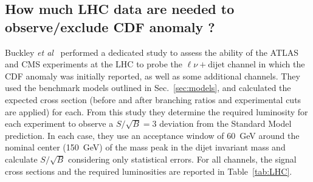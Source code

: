 \subsection{How much LHC data are needed to observe/exclude CDF anomaly ?}
\label{sec:dataneeded}
Buckley \textit{et al}~\cite{BuckleyHooperMartin} 
performed a dedicated study to assess the 
ability of the ATLAS and CMS experiments at the LHC to 
probe the $\ell\nu+\text{dijet}$ channel in which the CDF 
anomaly was initially reported, as well as some additional channels.
They used the benchmark models outlined in Sec.~\ref{sec:models}, 
and calculated the expected cross section (before and after 
branching ratios and experimental cuts are applied) for each.
From this study they 
determine the required luminosity for each experiment to 
observe a $S/\sqrt{B} = 3$ deviation from the Standard Model prediction. 
In each case, they use an acceptance window of 60~GeV around 
the nominal center (150~GeV) of the mass peak in the dijet 
invariant mass and calculate $S/\sqrt{B}$ considering only 
statistical errors.
For all channels, the signal cross sections and the required luminosities 
are reported in Table~\ref{tab:LHC}.
